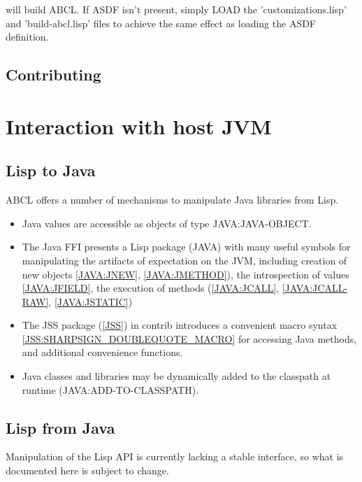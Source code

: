 will build ABCL.  If ASDF isn't present, simply LOAD the
'customizations.lisp' and 'build-abcl.lisp' files to achieve the same
effect as loading the ASDF definition.

\subsection{Contributing}

\section{Interaction with host JVM}


\subsection{Lisp to Java}

ABCL offers a number of mechanisms to manipulate Java libraries from
Lisp.

\begin{itemize}
\item Java values are accessible as objects of type JAVA:JAVA-OBJECT.
\item The Java FFI presents a Lisp package (JAVA) with many useful
  symbols for manipulating the artifacts of expectation on the JVM,
  including creation of new objects \ref{JAVA:JNEW}, \ref{JAVA:JMETHOD}), the
  introspection of values \ref{JAVA:JFIELD}, the execution of methods
  (\ref{JAVA:JCALL}, \ref{JAVA:JCALL-RAW}, \ref{JAVA:JSTATIC})
\item The JSS package (\ref{JSS}) in contrib introduces a convenient macro
  syntax \ref{JSS:SHARPSIGN_DOUBLEQUOTE_MACRO} for accessing Java
  methods, and additional convenience functions.
\item Java classes and libraries may be dynamically added to the
  classpath at runtime (JAVA:ADD-TO-CLASSPATH).
\end{itemize}

\subsection{Lisp from Java}

Manipulation of the Lisp API is currently lacking a stable interface,
so what is documented here is subject to change.  


